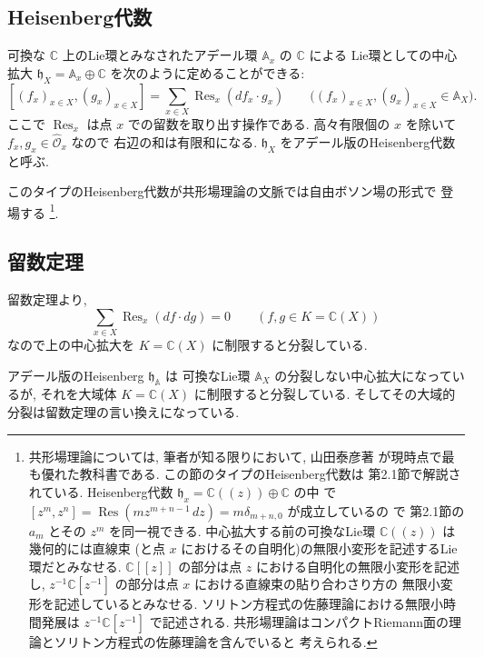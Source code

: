 \documentclass[12pt,twoside]{jarticle}
\newcommand\C{{\mathbb C}} %
\theoremstyle{definition} %
\theoremstyle{definition} %
\theoremstyle{definition} %
\numberwithin{theorem}{section}
\numberwithin{equation}{section}
\numberwithin{figure}{section}
\numberwithin{table}{section}
\newcommand\Res{\mathop{\mathrm{Res}}\nolimits}
\newcommand\h{{\mathfrak h}}
\newcommand\OO{{\mathcal O}}
\newcommand\Ohat{{\widehat \OO}}
\newcommand\A{{\mathbb A}}
\begin{document}

\subsection{Heisenberg代数}

可換な $\C$ 上のLie環とみなされたアデール環 $\A_x$ の $\C$ による
Lie環としての中心拡大 $\h_X=\A_x\oplus\C$ を次のように定めることができる:
\[
 [(f_x)_{x\in X}, (g_x)_{x\in X}] = \sum_{x\in X} \Res_x(df_x\cdot g_x)
 \qquad \bigl((f_x)_{x\in X}, (g_x)_{x\in X}\in\A_X\bigr).
\]
ここで $\Res_x$ は点 $x$ での留数を取り出す操作である.
高々有限個の $x$ を除いて $f_x,g_x\in\Ohat_x$ なので
右辺の和は有限和になる.
$\h_X$ をアデール版のHeisenberg代数と呼ぶ.

このタイプのHeisenberg代数が共形場理論の文脈では自由ボソン場の形式で
登場する%
\footnote{共形場理論については, 筆者が知る限りにおいて,
山田泰彦著 \cite{yamada} が現時点で最も優れた教科書である.
この節のタイプのHeisenberg代数は \cite{yamada} 第2.1節で解説されている.
Heisenberg代数 $\h_x=\C((z))\oplus\C$ の中
で $[z^m,z^n]=\Res(mz^{m+n-1}\,dz)=m\delta_{m+n,0}$ が成立しているの
で \cite{yamada} 第2.1節の $a_m$ とその $z^m$ を同一視できる.
中心拡大する前の可換なLie環 $\C((z))$ は幾何的には直線束
(と点 $x$ におけるその自明化)の無限小変形を記述するLie環だとみなせる.
$\C[[z]]$ の部分は点 $z$ における自明化の無限小変形を記述し,
$z^{-1}\C[z^{-1}]$ の部分は点 $x$ における直線束の貼り合わさり方の
無限小変形を記述しているとみなせる.
ソリトン方程式の佐藤理論における無限小時間発展は $z^{-1}\C[z^{-1}]$ で記述される.
共形場理論はコンパクトRiemann面の理論とソリトン方程式の佐藤理論を含んでいると
考えられる.
}.


\subsection{留数定理}

留数定理より,
\[
\sum_{x\in X} \Res_x(df\cdot dg)=0 \qquad (f,g\in K=\C(X))
\]
なので上の中心拡大を $K=\C(X)$ に制限すると分裂している.

アデール版のHeisenberg $\h_\A$ は
可換なLie環 $\A_X$ の分裂しない中心拡大になっているが,
それを大域体 $K=\C(X)$ に制限すると分裂している.
そしてその大域的分裂は留数定理の言い換えになっている.
\end{document}
